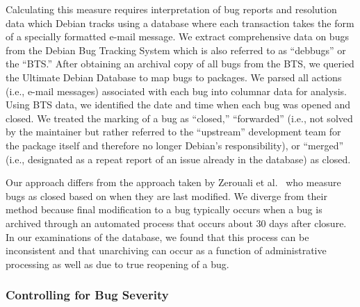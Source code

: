 \documentclass[10pt,conference]{IEEEtran}\usepackage[]{graphicx}\usepackage[usenames,dvipsnames]{color}
\begin{document}
Calculating this measure requires interpretation of bug reports and resolution data which Debian tracks using a database where each transaction takes the form of a specially formatted e-mail message. %
We extract comprehensive data on bugs from the Debian Bug Tracking System which is also referred to as ``debbugs'' or the ``BTS.'' After obtaining an archival copy of all bugs from the BTS, we queried the Ultimate Debian Database \cite{nussbaum_ultimate_2010} to map bugs to packages. We parsed all actions (i.e., e-mail messages) associated with each bug into columnar data for analysis.
Using BTS data, we identified the date and time when each bug was opened and closed. We treated the marking of a bug as ``closed,'' ``forwarded'' (i.e., not solved by the maintainer but rather referred to the ``upstream'' development team for the package itself and therefore no longer Debian's responsibility), or ``merged'' (i.e., designated as a repeat report of an issue already in the database) as closed.

Our approach differs from the approach taken by Zerouali et al.~\cite{zerouali_relation_2019} who measure bugs as closed based on when they are last modified. We diverge from their method because final modification to a bug typically occurs when a bug is archived through an automated process that occurs about 30 days after closure. In our examinations of the database, we found that this process can be inconsistent and that unarchiving can occur as a function of administrative processing as well as due to true reopening of a bug. 

\subsubsection*{Controlling for Bug Severity}
\end{document}
